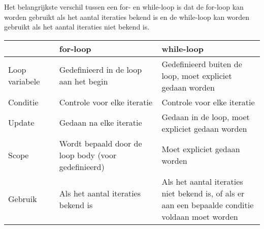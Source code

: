 Het belangrijkste verschil tussen een for- en while-loop is dat de for-loop kan worden gebruikt als het aantal iteraties bekend is en de while-loop kan worden gebruikt als het aantal iteraties niet bekend is.

\begin{table}[ht]
\centering
\begin{tabular}{ |p{0.2\linewidth}|p{0.4\linewidth}|p{0.4\linewidth}| }
\hline
\rowcolor{gray!60}
& for-loop & while-loop \\
\hline
Loop variabele & Gedefinieerd in de loop aan het begin & Gedefinieerd buiten de loop, moet expliciet gedaan worden \\
\hline
Conditie & Controle voor elke iteratie & Controle voor elke iteratie \\
\hline
Update & Gedaan na elke iteratie & Gedaan in de loop, moet expliciet gedaan worden \\
\hline
Scope & Wordt bepaald door de loop body (voor gedefinieerd) & Moet expliciet gedaan worden \\
\hline
Gebruik & Als het aantal iteraties bekend is & Als het aantal iteraties niet bekend is, of als er aan een bepaalde conditie voldaan moet worden \\
\hline
\end{tabular}
\end{table}

